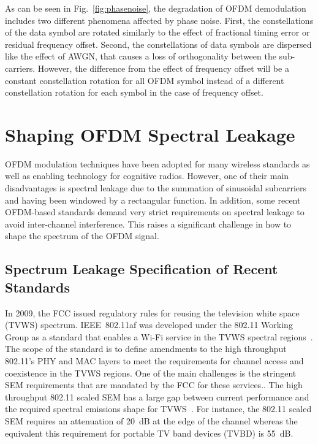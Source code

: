 As can be seen in Fig.~\ref{fig:phasenoise}, the degradation of OFDM demodulation includes two different phenomena affected by phase noise.
First, the constellations of the data symbol are rotated similarly to the effect of fractional timing error or residual frequency offset.
Second, the constellations of data symbols are dispersed like the effect of AWGN, that causes a loss of orthogonality between the sub-carriers.
However, the difference from the effect of frequency offset will be a constant constellation rotation for all OFDM symbol instead of a different constellation rotation for each symbol in the case of  frequency offset.


\section{Shaping OFDM Spectral Leakage}
\label{Ch2:SpecLeak}
OFDM modulation techniques have been adopted for many wireless standards as well as enabling technology for cognitive radios.
However, one of their main disadvantages is spectral leakage due to the summation of sinusoidal subcarriers and having been windowed by a rectangular function.
In addition, some recent OFDM-based standards demand very strict requirements on spectral leakage to avoid inter-channel interference.
This raises a significant challenge in how to shape the spectrum of the OFDM signal. 

\subsection{Spectrum Leakage Specification of Recent Standards}
In 2009, the FCC issued regulatory rules for reusing the television white space (TVWS) spectrum.
IEEE~802.11af was developed under the 802.11 Working Group as a standard that enables a Wi-Fi service in the TVWS spectral regions~\cite{802-11af2013}. 
The scope of the standard is to define amendments to the high throughput 802.11's PHY and MAC layers to meet the requirements for channel access and coexistence in the TVWS regions.
One of the main challenges is the stringent SEM requirements that are mandated by the FCC for these services.. 
The high throughput 802.11 scaled SEM has a large gap between current performance and the required spectral emissions shape for TVWS~\cite{Shellhammer2009}.
For instance, the 802.11 scaled SEM requires an attenuation of 20~dB at the edge of the channel whereas the equivalent this requirement for portable TV band devices (TVBD) is 55~dB.

